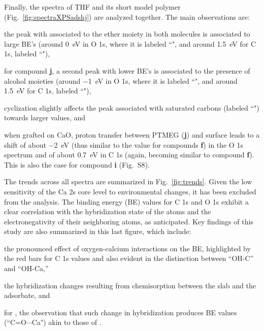 \documentclass[%
aip,
amsmath,amssymb,
preprint,%
jcp,
showkeys,
]{revtex4-2}
\begin{document}
\clearpage

Finally, the spectra of THF and its short model polymer (Fig.~\ref{fig:spectraXPSadshj}) are analyzed together. The main observations are: \begin{inparaenum}[(i)]
	\item the peak with associated to the ether moiety in both molecules is associated to large BE's (around \SI{0}{\electronvolt} in O 1s, where it is labeled ``", and around \SI{1.5}{\electronvolt} for C 1s, labeled ``"), 
	\item for compound \textbf{j}, a second peak with lower BE's is associated to the presence of alcohol moieties (around \SI{-1}{\electronvolt} in O 1s, where it is labeled ``", and around \SI{1.5}{\electronvolt} for C 1s, labeled ``"), 
	\item cyclization slightly affects the peak associated with saturated carbons (labeled ``") towards larger values, and
	\item when grafted on CaO, proton transfer between PTMEG (\textbf{j}) and surface leads to a shift of about \SI{-2}{\electronvolt}  (thus similar to the value for compounds \textbf{f}) in the O 1s spectrum and of about \SI{0.7}{\electronvolt} in C 1s (again, becoming similar to compound \textbf{f}). This is also the case for compound \textbf{i} (Fig.~S8).
\end{inparaenum}


\clearpage

The trends across all spectra are summarized in Fig.~\ref{fig:trends}. Given the low sensitivity of the Ca 2s core level to environmental changes, it has been excluded from the analysis. The binding energy (BE) values for C 1s and O 1s exhibit a clear correlation with the hybridization state of the atoms and the electronegativity of their neighboring atoms, as anticipated.\cite{stevieIntroductionXrayPhotoelectron2020} 
Key findings of this study are also summarized in this last figure, which include: 
\begin{inparaenum}[(i)]
	\item the pronounced effect of oxygen-calcium interactions on the BE, highlighted by the red bars for C 1s values and also evident in the distinction between ``OH-C'' and ``OH-Ca,'' 
	\item the hybridization changes resulting from chemisorption between the slab and the adsorbate, and 
	\item for , the observation that such change in hybridization produces BE values (``C=O$\cdots$Ca") akin to those of .
\end{inparaenum}
\end{document}
